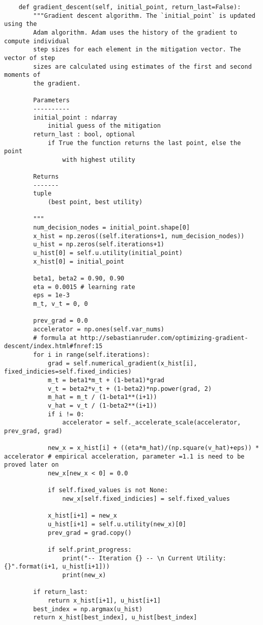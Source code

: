 \documentclass[12pt]{article}
\begin{document}
\begin{verbatim}
	def gradient_descent(self, initial_point, return_last=False):
		"""Gradient descent algorithm. The `initial_point` is updated using the
		Adam algorithm. Adam uses the history of the gradient to compute individual
		step sizes for each element in the mitigation vector. The vector of step
		sizes are calculated using estimates of the first and second moments of
		the gradient.

		Parameters
		----------
		initial_point : ndarray
			initial guess of the mitigation
		return_last : bool, optional
			if True the function returns the last point, else the point
				with highest utility

		Returns
		-------
		tuple
			(best point, best utility)
		
		"""
		num_decision_nodes = initial_point.shape[0]
		x_hist = np.zeros((self.iterations+1, num_decision_nodes))
		u_hist = np.zeros(self.iterations+1)
		u_hist[0] = self.u.utility(initial_point)
		x_hist[0] = initial_point
		
		beta1, beta2 = 0.90, 0.90
		eta = 0.0015 # learning rate
		eps = 1e-3
		m_t, v_t = 0, 0

		prev_grad = 0.0
		accelerator = np.ones(self.var_nums)
		# formula at http://sebastianruder.com/optimizing-gradient-descent/index.html#fnref:15	
		for i in range(self.iterations):
			grad = self.numerical_gradient(x_hist[i], fixed_indicies=self.fixed_indicies)
			m_t = beta1*m_t + (1-beta1)*grad
			v_t = beta2*v_t + (1-beta2)*np.power(grad, 2)
			m_hat = m_t / (1-beta1**(i+1))
			v_hat = v_t / (1-beta2**(i+1))
			if i != 0:
				accelerator = self._accelerate_scale(accelerator, prev_grad, grad)
			
			new_x = x_hist[i] + ((eta*m_hat)/(np.square(v_hat)+eps)) * accelerator # empirical acceleration, parameter =1.1 is need to be proved later on
			new_x[new_x < 0] = 0.0

			if self.fixed_values is not None:
				new_x[self.fixed_indicies] = self.fixed_values

			x_hist[i+1] = new_x
			u_hist[i+1] = self.u.utility(new_x)[0]
			prev_grad = grad.copy()

			if self.print_progress:
				print("-- Iteration {} -- \n Current Utility: {}".format(i+1, u_hist[i+1]))
				print(new_x)

		if return_last:
			return x_hist[i+1], u_hist[i+1]
		best_index = np.argmax(u_hist)
		return x_hist[best_index], u_hist[best_index]
\end{verbatim}
\end{document}
